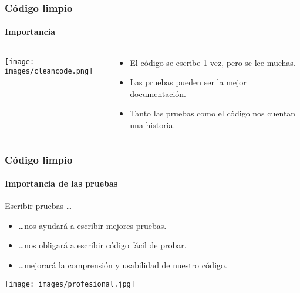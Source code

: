   \begin{frame}
   \frametitle{Código limpio}
   \framesubtitle{Importancia}

   \begin{columns}
    \begin{column}{4cm}
     \texttt{[image: images/cleancode.png]}
    \end{column}
    \begin{column}{7cm}
     \begin{itemize}
      \item El código se escribe 1 vez, pero se lee muchas.
      \item Las pruebas pueden ser la mejor documentación.
      \item Tanto las pruebas como el código nos cuentan una historia.
     \end{itemize}
    \end{column}
   \end{columns}
  \end{frame}


  \begin{frame}
   \frametitle{Código limpio}
   \framesubtitle{Importancia de las pruebas}

   Escribir pruebas \ldots
   \begin{itemize}
    \item \ldots nos ayudará a escribir mejores pruebas.
    \item \ldots nos obligará a escribir código fácil de probar.
    \item \ldots mejorará la comprensión y usabilidad de nuestro código.
   \end{itemize}
  \end{frame}

  \begin{frame}
   \begin{center}
    \texttt{[image: images/profesional.jpg]}
   \end{center}
  \end{frame}

